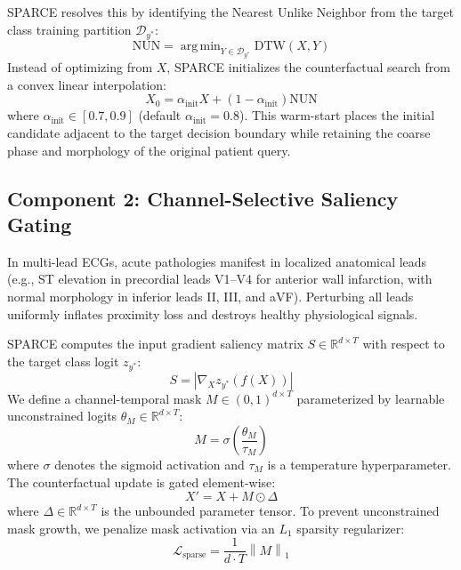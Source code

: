 \documentclass[conference]{IEEEtran}
\newcommand{\R}{\mathbb{R}}
\newcommand{\norm}[1]{\left\lVert#1\right\rVert}
\DeclareMathOperator*{\argmin}{arg\,min}
\begin{document}
SPARCE resolves this by identifying the Nearest Unlike Neighbor from the target class training partition $\mathcal{D}_{y^*}$:
\begin{equation}
    \text{NUN} = \argmin_{Y \in \mathcal{D}_{y^*}} \text{DTW}(X, Y)
\end{equation}
Instead of optimizing from $X$, SPARCE initializes the counterfactual search from a convex linear interpolation:
\begin{equation}
    X_0 = \alpha_{\text{init}} X + (1 - \alpha_{\text{init}}) \text{NUN}
\end{equation}
where $\alpha_{\text{init}} \in [0.7, 0.9]$ (default $\alpha_{\text{init}} = 0.8$). This warm-start places the initial candidate adjacent to the target decision boundary while retaining the coarse phase and morphology of the original patient query.

\subsection{Component 2: Channel-Selective Saliency Gating}
In multi-lead ECGs, acute pathologies manifest in localized anatomical leads (e.g., ST elevation in precordial leads V1--V4 for anterior wall infarction, with normal morphology in inferior leads II, III, and aVF). Perturbing all leads uniformly inflates proximity loss and destroys healthy physiological signals.

SPARCE computes the input gradient saliency matrix $S \in \R^{d \times T}$ with respect to the target class logit $z_{y^*}$:
\begin{equation}
    S = \left\lvert \nabla_X z_{y^*}(f(X)) \right\rvert
\end{equation}
We define a channel-temporal mask $M \in (0, 1)^{d \times T}$ parameterized by learnable unconstrained logits $\theta_M \in \R^{d \times T}$:
\begin{equation}
    M = \sigma\left( \frac{\theta_M}{\tau_M} \right)
\end{equation}
where $\sigma$ denotes the sigmoid activation and $\tau_M$ is a temperature hyperparameter. The counterfactual update is gated element-wise:
\begin{equation}
    X' = X + M \odot \Delta
\end{equation}
where $\Delta \in \R^{d \times T}$ is the unbounded parameter tensor. To prevent unconstrained mask growth, we penalize mask activation via an $L_1$ sparsity regularizer:
\begin{equation}
    \mathcal{L}_{\text{sparse}} = \frac{1}{d \cdot T} \norm{M}_1
\end{equation}
\end{document}
